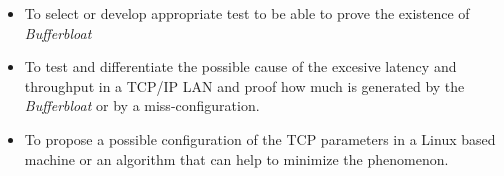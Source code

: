 \begin{center}
\begin{itemize}
\item To select or develop appropriate test to be able to prove the existence of \textit{Bufferbloat}
\item To test and differentiate the possible cause of the excesive latency and throughput in a TCP/IP LAN and proof how much is generated by the \textit{Bufferbloat} or by a miss-configuration. 
\item To propose a possible configuration of the TCP parameters in a Linux based machine or an algorithm that can help to minimize the phenomenon. 
\end{itemize}
\end{center}
